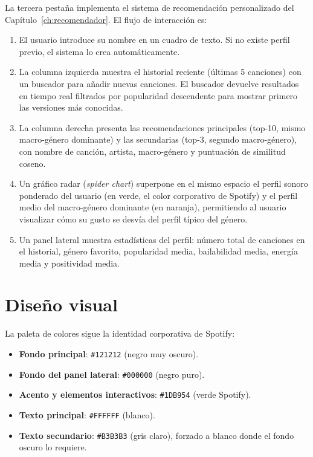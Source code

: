 \documentclass[12pt, a4paper]{book}
\theoremstyle{definition}
\begin{document}
La tercera pestaña implementa el sistema de recomendación personalizado del
Capítulo~\ref{ch:recomendador}. El flujo de interacción es:

\begin{enumerate}
  \item El usuario introduce su nombre en un cuadro de texto. Si no existe
        perfil previo, el sistema lo crea automáticamente.
  \item La columna izquierda muestra el historial reciente (últimas 5
        canciones) con un buscador para añadir nuevas canciones. El buscador
        devuelve resultados en tiempo real filtrados por popularidad
        descendente para mostrar primero las versiones más conocidas.
  \item La columna derecha presenta las recomendaciones principales (top-10,
        mismo macro-género dominante) y las secundarias (top-3, segundo
        macro-género), con nombre de canción, artista, macro-género y
        puntuación de similitud coseno.
  \item Un gráfico radar (\textit{spider chart}) superpone en el mismo
        espacio el perfil sonoro ponderado del usuario (en verde, el color
        corporativo de Spotify) y el perfil medio del macro-género dominante
        (en naranja), permitiendo al usuario visualizar cómo su gusto se
        desvía del perfil típico del género.
  \item Un panel lateral muestra estadísticas del perfil: número total de
        canciones en el historial, género favorito, popularidad media,
        bailabilidad media, energía media y positividad media.
\end{enumerate}

\section{Diseño visual}
\label{sec:diseno_visual}

La paleta de colores sigue la identidad corporativa de Spotify:
\begin{itemize}
  \item \textbf{Fondo principal}: \texttt{\#121212} (negro muy oscuro).
  \item \textbf{Fondo del panel lateral}: \texttt{\#000000} (negro puro).
  \item \textbf{Acento y elementos interactivos}: \texttt{\#1DB954} (verde
        Spotify).
  \item \textbf{Texto principal}: \texttt{\#FFFFFF} (blanco).
  \item \textbf{Texto secundario}: \texttt{\#B3B3B3} (gris claro), forzado
        a blanco donde el fondo oscuro lo requiere.
\end{itemize}
\end{document}
